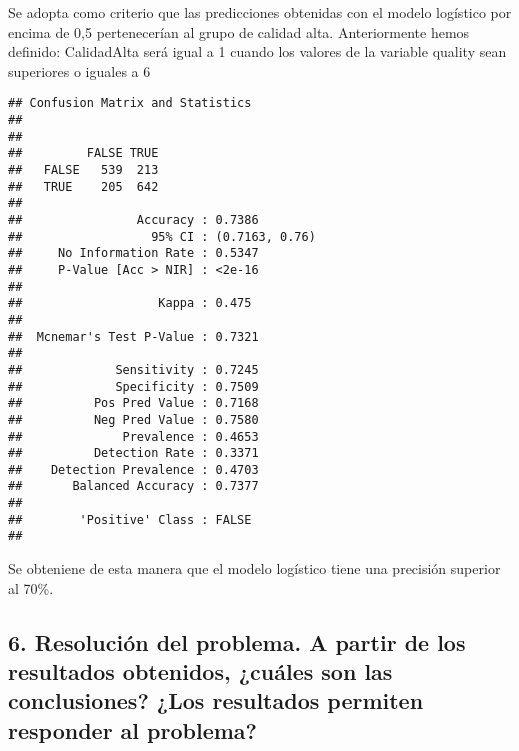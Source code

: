 \documentclass[
]{article}
\newenvironment{Shaded}{\begin{snugshade}}{\end{snugshade}}
\newcommand{\AttributeTok}[1]{\textcolor[rgb]{0.77,0.63,0.00}{#1}}
\newcommand{\FloatTok}[1]{\textcolor[rgb]{0.00,0.00,0.81}{#1}}
\newcommand{\FunctionTok}[1]{\textcolor[rgb]{0.00,0.00,0.00}{#1}}
\newcommand{\NormalTok}[1]{#1}
\newcommand{\SpecialCharTok}[1]{\textcolor[rgb]{0.00,0.00,0.00}{#1}}
\newcommand{\StringTok}[1]{\textcolor[rgb]{0.31,0.60,0.02}{#1}}
\begin{document}
Se adopta como criterio que las predicciones obtenidas con el modelo
logístico por encima de 0,5 pertenecerían al grupo de calidad alta.
Anteriormente hemos definido: CalidadAlta será igual a 1 cuando los
valores de la variable quality sean superiores o iguales a 6

\begin{Shaded}
\end{Shaded}

\begin{verbatim}
## Confusion Matrix and Statistics
## 
##        
##         FALSE TRUE
##   FALSE   539  213
##   TRUE    205  642
##                                         
##                Accuracy : 0.7386        
##                  95% CI : (0.7163, 0.76)
##     No Information Rate : 0.5347        
##     P-Value [Acc > NIR] : <2e-16        
##                                         
##                   Kappa : 0.475         
##                                         
##  Mcnemar's Test P-Value : 0.7321        
##                                         
##             Sensitivity : 0.7245        
##             Specificity : 0.7509        
##          Pos Pred Value : 0.7168        
##          Neg Pred Value : 0.7580        
##              Prevalence : 0.4653        
##          Detection Rate : 0.3371        
##    Detection Prevalence : 0.4703        
##       Balanced Accuracy : 0.7377        
##                                         
##        'Positive' Class : FALSE         
## 
\end{verbatim}

Se obteniene de esta manera que el modelo logístico tiene una precisión
superior al 70\%.

\hypertarget{resoluciuxf3n-del-problema.-a-partir-de-los-resultados-obtenidos-cuuxe1les-son-las-conclusiones-los-resultados-permiten-responder-al-problema}{%
\subsection{6. Resolución del problema. A partir de los resultados
obtenidos, ¿cuáles son las conclusiones? ¿Los resultados permiten
responder al
problema?}\label{resoluciuxf3n-del-problema.-a-partir-de-los-resultados-obtenidos-cuuxe1les-son-las-conclusiones-los-resultados-permiten-responder-al-problema}}
\end{document}
